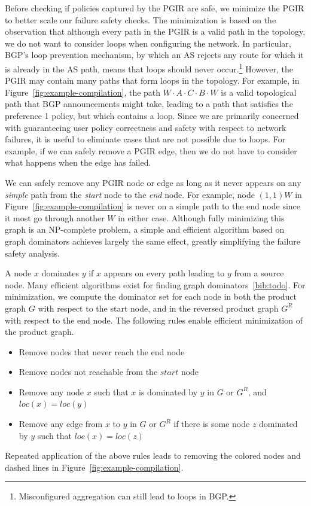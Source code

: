Before checking if policies captured by the PGIR are safe, we minimize the PGIR to better scale our failure safety checks. The minimization is based on the observation that although every path in the PGIR is a valid path in the topology, we do not want to consider loops when configuring the network. In particular, BGP's loop prevention mechanism, by which an AS rejects any route for which it is already in the AS path, means that loops should never occur.\footnote{ Misconfigured aggregation can still lead to loops in BGP.}
%
However, the PGIR may contain many paths that form loops in the topology. For example, in Figure~\ref{fig:example-compilation}, the path $W \cdot A \cdot C \cdot B \cdot W$ is a valid topological path that BGP announcements might take, leading to a path that satisfies the preference 1 policy, but which contains a loop.
%
Since we are primarily concerned with guaranteeing user policy correctness and safety with respect to network failures, it is useful to eliminate cases that are not possible due to loops. For example, if we can safely remove a PGIR edge, then we do not have to consider what happens when the edge has failed.

We can safely remove any PGIR node or edge as long as it never appears on any \emph{simple} path from the \textit{start} node to the \emph{end} node. For example, node $(1,1) W$ in Figure~\ref{fig:example-compilation} is never on a simple path to the end node since it most go through another $W$ in either case.
%
Although fully minimizing this graph is an NP-complete problem,  a simple and efficient algorithm based on graph dominators achieves largely the same effect, greatly simplifying the failure safety analysis.

A node $x$ dominates $y$ if $x$ appears on every path leading to $y$ from a source node. Many efficient algorithms exist for finding graph dominators~\ref{bib:todo}. For minimization, we compute the dominator set for each node in both the product graph $G$ with respect to the start node, and in the reversed product graph $G^R$ with respect to the end node. The following rules enable efficient minimization of the product graph.
%
\begin{itemize}
  \item Remove nodes that never reach the end node
  \item Remove nodes not reachable from the $start$ node
  \item Remove any node $x$ such that $x$ is dominated by $y$ in $G$ or $G^R$, and $loc(x) = loc(y)$
  \item Remove any edge from $x$ to $y$ in $G$ or $G^R$ if there is some node $z$ dominated by $y$ such that $loc(x) = loc(z)$
\end{itemize}
%
Repeated application of the above rules leads to removing the colored nodes and dashed lines in Figure~\ref{fig:example-compilation}.

